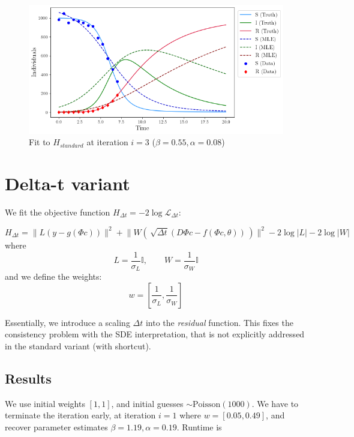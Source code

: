 \begin{figure}
\centering
\includegraphics{img/standard_fit_iter3.png}
\caption{Fit to \(H_{standard}\) at iteration \(i=3\)
(\(\beta=0.55, \alpha=0.08\))}
\end{figure}

\hypertarget{delta-t-variant}{%
\section{Delta-t variant}\label{delta-t-variant}}

We fit the objective function
\(H_{\Delta t} = -2\log\mathcal{L}_{\Delta t}\):

\[
H_{\Delta t} = \lVert L(y - g(\Phi c))\rVert^2 + \lVert W(\,\sqrt{\Delta t}(D\Phi c - f(\Phi c, \theta))\,) \rVert^2 - 2\log{|L|} - 2\log{|W|}
\] where
\[L = \frac{1}{\sigma_L} \mathbb{I},\qquad W = \frac{1}{\sigma_W} \mathbb{I}\]
and we define the weights:
\[w = \left[\frac{1}{\sigma_L}, \frac{1}{\sigma_W}\right]\]

Essentially, we introduce a scaling \(\Delta t\) into the
\emph{residual} function. This fixes the consistency problem with the
SDE interpretation, that is not explicitly addressed in the standard
variant (with shortcut).

\hypertarget{results-1}{%
\subsection{Results}\label{results-1}}

We use initial weights \([1, 1]\), and initial guesses
\(\sim \text{Poisson}(1000)\). We have to terminate the iteration early,
at iteration \(i=1\) where \(w=[0.05, 0.49]\), and recover parameter
estimates \(\beta = 1.19, \alpha = 0.19\). Runtime is

